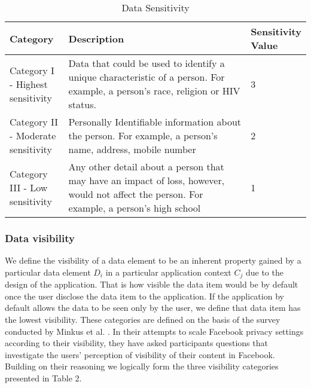 \documentclass[10pt]{article}
\begin{document}
\begin{center}
\begin{table}[htbp]
\caption{Data Sensitivity}
\begin{center}
\begin{adjustbox}{width=0.5\textwidth} 
\begin{tabular}{|p{0.2\linewidth}|p{0.7\linewidth}|p{0.1\linewidth}|} 
\hline
Category & Description & Sensitivity Value \\
\hline
Category I - Highest sensitivity & Data that could be used to identify a unique characteristic of a person. For example, a person's race, religion or HIV status. & 3 \\
\hline
Category II - Moderate sensitivity & Personally Identifiable information about the person. For example, a person's name, address, mobile number & 2 \\
\hline
Category III - Low sensitivity & Any other detail about a person that may have an impact of loss, however, would not affect the person. For example, a person's high school & 1 \\
\hline
\end{tabular}
\end{adjustbox}
\end{center}
\end{table}
\end{center} 

\subsubsection{Data visibility} 

We define the visibility of a data element to be an inherent property gained by a particular data element \textit{$D_i$} in a particular application context \textit{$C_j$} due to the design of the application. That is how visible the data item would be by default once the user disclose the data item to the application. If the application by default allows the data to be seen only by the user, we define that data item has the lowest visibility. These categories are defined on the basis of the survey conducted by Minkus et al. \cite{minkus2014scale}. In their attempts to scale Facebook privacy settings according to their visibility, they have asked participants questions that investigate the users' perception of visibility of their content in Facebook. Building on their reasoning we logically form the three visibility categories presented in Table 2.
\end{document}
